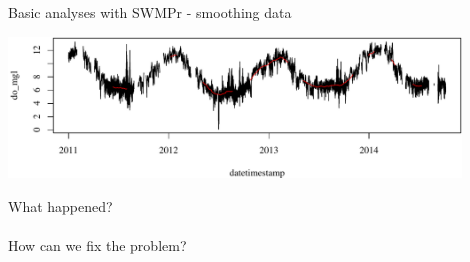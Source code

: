 \documentclass[xcolor=dvipsnames,serif]{beamer}\usepackage[]{graphicx}\usepackage[]{color}
\newenvironment{knitrout}{}{} %
\begin{document}
\begin{frame}[fragile]{Basic analyses with SWMPr - smoothing data}
\begin{knitrout}\scriptsize
{}\color{fgcolor}

{\centering \includegraphics[width=0.9\textwidth]{figure/unnamed-chunk-16-1} 

}



\end{knitrout}
What happened?  \\~\\
How can we fix the problem? 
\end{frame}
\end{document}
